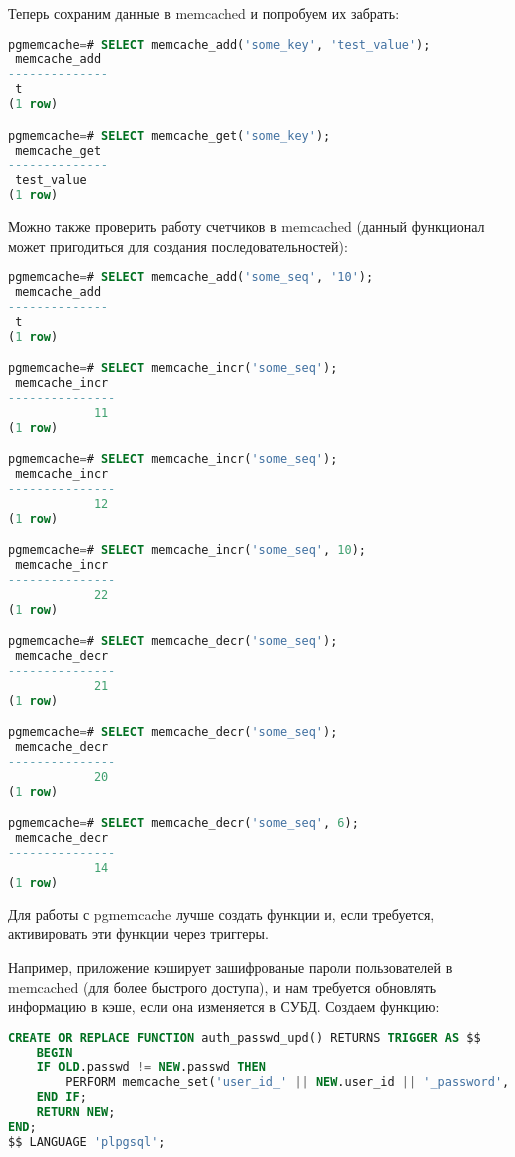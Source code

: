 Теперь сохраним данные в memcached и попробуем их забрать:

\begin{lstlisting}[language=SQL,label=lst:pgcache9,caption=Проверка]
pgmemcache=# SELECT memcache_add('some_key', 'test_value');
 memcache_add
--------------
 t
(1 row)

pgmemcache=# SELECT memcache_get('some_key');
 memcache_get
--------------
 test_value
(1 row)

\end{lstlisting}

Можно также проверить работу счетчиков в memcached (данный функционал может пригодиться для создания последовательностей):

\begin{lstlisting}[language=SQL,label=lst:pgcache10,caption=Проверка]
pgmemcache=# SELECT memcache_add('some_seq', '10');
 memcache_add
--------------
 t
(1 row)

pgmemcache=# SELECT memcache_incr('some_seq');
 memcache_incr
---------------
            11
(1 row)

pgmemcache=# SELECT memcache_incr('some_seq');
 memcache_incr
---------------
            12
(1 row)

pgmemcache=# SELECT memcache_incr('some_seq', 10);
 memcache_incr
---------------
            22
(1 row)

pgmemcache=# SELECT memcache_decr('some_seq');
 memcache_decr
---------------
            21
(1 row)

pgmemcache=# SELECT memcache_decr('some_seq');
 memcache_decr
---------------
            20
(1 row)

pgmemcache=# SELECT memcache_decr('some_seq', 6);
 memcache_decr
---------------
            14
(1 row)

\end{lstlisting}

Для работы с pgmemcache лучше создать функции и, если требуется, активировать эти функции через триггеры.

Например, приложение кэширует зашифрованые пароли пользователей в memcached (для более быстрого доступа), и нам требуется обновлять информацию в кэше, если она изменяется в СУБД. Создаем функцию:

\begin{lstlisting}[language=SQL,label=lst:pgcache11,caption=Функция для обновления данных в кэше]
CREATE OR REPLACE FUNCTION auth_passwd_upd() RETURNS TRIGGER AS $$
	BEGIN
	IF OLD.passwd != NEW.passwd THEN
		PERFORM memcache_set('user_id_' || NEW.user_id || '_password', NEW.passwd);
	END IF;
	RETURN NEW;
END;
$$ LANGUAGE 'plpgsql';
\end{lstlisting}

